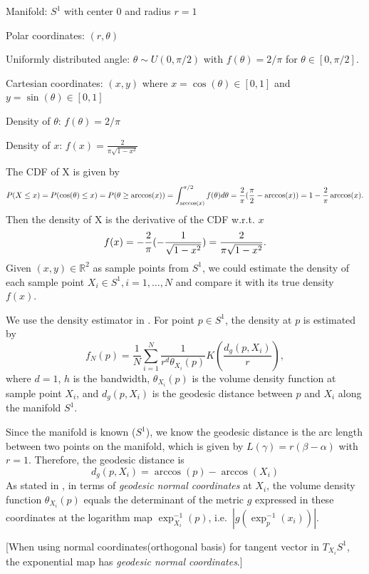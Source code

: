 \documentclass[11pt,a4paper,]{article}
\begin{document}
Manifold: \(S^1\) with center 0 and radius \(r=1\)

Polar coordinates: \((r, \theta)\)

Uniformly distributed angle: \(\theta \sim U(0, \pi/2)\) with \(f(\theta) = 2 / \pi\) for \(\theta \in [0, \pi /2]\).

Cartesian coordinates: \((x, y)\) where \(x = \cos(\theta) \in [0, 1]\) and \(y = \sin(\theta) \in [0, 1]\)

Density of \(\theta\): \(f(\theta) = 2 / \pi\)

Density of \(x\): \(f(x) = \frac{2}{\pi \sqrt{1-x^2}}\)

The CDF of X is given by
\[
P(X \leq x) = P(\cos(\theta) \leq x) \\
= P(\theta \geq \arccos(x)) \\
= \int_{\arccos(x)}^{\pi/2} f(\theta) d\theta \\
=  \frac{2}{\pi} (\frac{\pi}{2} - \arccos(x) ) \\
= 1 - \frac{2}{\pi} \arccos(x).
\]
Then the density of X is the derivative of the CDF w.r.t. \(x\) \[
f(x) = -\frac{2}{\pi} (-\frac{1}{\sqrt{1 - x^2}}) \\
= \frac{2}{\pi \sqrt{1 - x^2}}.
\]
Given \((x, y) \in \mathbb{R}^2\) as sample points from \(S^1\), we could
estimate the density of each sample point \(X_i \in S^1, i = 1, \dots, N\)
and compare it with its true density \(f(x)\).

We use the density estimator in \textcite{Pelletier2005-vu}. For point \(p \in S^1\), the density at \(p\) is estimated by
\[
f_N(p) = \frac{1}{N} \sum_{i=1}^{N} \frac{1}{r^d \theta_{X_i}(p)} K(\frac{d_g(p, X_i)}{r}),
\]
where \(d=1\), \(h\) is the bandwidth, \(\theta_{X_i}(p)\) is the volume density function at sample point \(X_i\), and \(d_g(p, X_i)\) is the geodesic distance between \(p\) and \(X_i\) along the manifold \(S^1\).

Since the manifold is known (\(S^1\)), we know the geodesic distance is the arc length between two points on the manifold, which is given by \(L(\gamma) = r(\beta - \alpha)\) with \(r=1\). Therefore, the geodesic distance is
\[
d_g(p, X_i) = \arccos(p) - \arccos(X_i)
\]
As stated in \textcite{Pelletier2005-vu}, in terms of \emph{geodesic normal coordinates} at \(X_i\), the volume density function \(\theta_{X_i}(p)\) equals the determinant of the metric \(g\) expressed in these coordinates at the logarithm map \(\exp_{X_i}^{-1}(p)\), i.e.~\(|g(\exp_p^{-1}(x_i))|\).

{[}When using normal coordinates(orthogonal basis) for tangent vector in \(T_{X_i}S^1\), the exponential map has \emph{geodesic normal coordinates}.{]}
\end{document}
